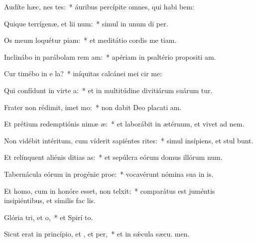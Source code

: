 \item Audíte hæc, nes tes:~* áuribus percípite omnes, qui habi bem:
\item Quique terrígenæ, et lii num:~* simul in unum di  per.
\item Os meum loquétur piam:~* et meditátio cordis me tiam.
\item Inclinábo in parábolam rem am:~* apériam in psaltério propositi am.
\item Cur timébo in e la?~* iníquitas calcánei mei cir me:
\item Qui confídunt in virte a:~* et in multitúdine divitiárum suárum tur.
\item Frater non rédimit, imet mo:~* non dabit Deo placati am.
\item Et prétium redemptiónis nimæ æ:~* et laborábit in ætérnum, et vivet ad  nem.
\item Non vidébit intéritum, cum víderit sapiéntes rites:~* simul insípiens, et stul bunt.
\item Et relínquent aliénis ditias as:~* et sepúlcra eórum domus illórum  num.
\item Tabernácula eórum in progénie  proe:~* vocavérunt nómina sua in  is.
\item Et homo, cum in honóre esset, non telxit:~* comparátus est juméntis insipiéntibus, et símilis fac  lis.
\item Glória tri, et o,~* et Spirí to.
\item Sicut erat in princípio, et , et per,~* et in sǽcula sæcu. men.
